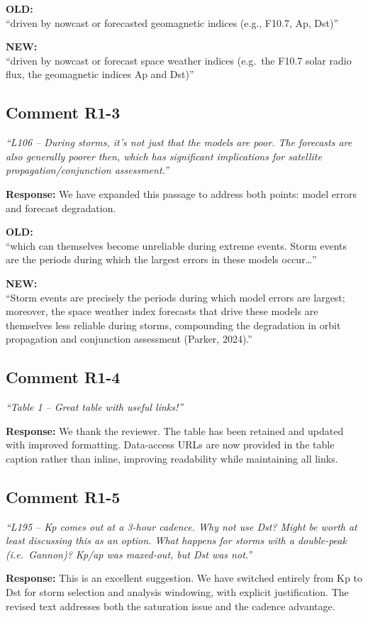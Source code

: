 \documentclass[11pt]{article}
\newcommand{\reviewercomment}[1]{%
  \medskip
  \noindent\textit{\color{reviewblue}#1}%
  \medskip
}
\newcommand{\oldtext}[1]{%
  \smallskip
  \noindent\hspace{1em}\begin{minipage}{0.92\textwidth}%
  \color{quotegray}\textbf{OLD:}\\[2pt]``#1''%
  \end{minipage}%
  \smallskip
}
\newcommand{\newtext}[1]{%
  \smallskip
  \noindent\hspace{1em}\begin{minipage}{0.92\textwidth}%
  \color{quotegreen}\textbf{NEW:}\\[2pt]``#1''%
  \end{minipage}%
  \smallskip
}
\begin{document}
\oldtext{driven by nowcast or forecasted geomagnetic indices (e.g., F10.7, Ap, Dst)}

\newtext{driven by nowcast or forecast space weather indices (e.g.\ the F10.7 solar radio flux, the geomagnetic indices Ap and Dst)}


\subsection{Comment R1-3}

\reviewercomment{%
``L106 -- During storms, it's not just that the models are poor. The forecasts are also generally poorer then, which has significant implications for satellite propagation/conjunction assessment.''}

\textbf{Response:}
We have expanded this passage to address both points: model errors and forecast degradation.

\oldtext{which can themselves become unreliable during extreme events. Storm events are the periods during which the largest errors in these models occur\ldots}

\newtext{Storm events are precisely the periods during which model errors are largest; moreover, the space weather index forecasts that drive these models are themselves less reliable during storms, compounding the degradation in orbit propagation and conjunction assessment (Parker, 2024).}


\subsection{Comment R1-4}

\reviewercomment{``Table 1 -- Great table with useful links!''}

\textbf{Response:}
We thank the reviewer. The table has been retained and updated with improved formatting. Data-access URLs are now provided in the table caption rather than inline, improving readability while maintaining all links.


\subsection{Comment R1-5}

\reviewercomment{%
``L195 -- Kp comes out at a 3-hour cadence. Why not use Dst? Might be worth at least discussing this as an option. What happens for storms with a double-peak (i.e.\ Gannon)? Kp/ap was maxed-out, but Dst was not.''}

\textbf{Response:}
This is an excellent suggestion. We have switched entirely from Kp to Dst for storm selection and analysis windowing, with explicit justification. The revised text addresses both the saturation issue and the cadence advantage.
\end{document}
